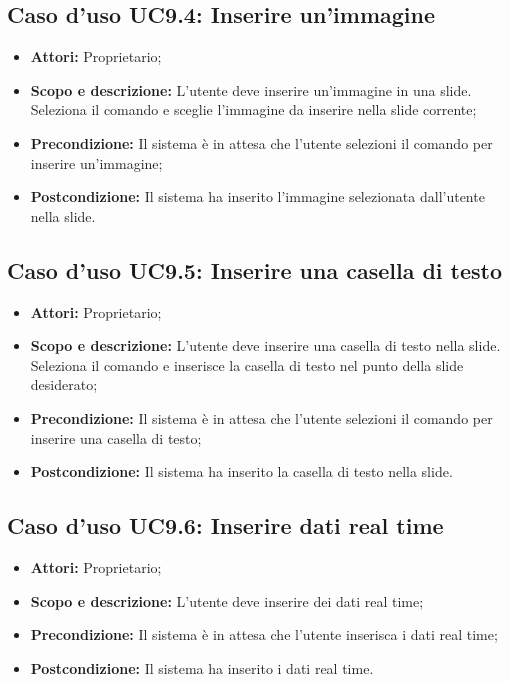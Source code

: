 \subsection{Caso d'uso UC9.4: Inserire un'immagine}
\begin{itemize}
\item \textbf{Attori:} Proprietario;
\item \textbf{Scopo e descrizione:} L'utente deve inserire un'immagine in una slide. Seleziona il comando e sceglie l'immagine da inserire nella slide corrente;
\item \textbf{Precondizione:} Il sistema è in attesa che l'utente selezioni il comando per inserire un'immagine;
\item \textbf{Postcondizione:} Il sistema ha inserito l'immagine selezionata dall'utente nella slide.
\end{itemize}


\subsection{Caso d'uso UC9.5: Inserire una casella di testo}
\begin{itemize}
\item \textbf{Attori:} Proprietario;
\item \textbf{Scopo e descrizione:} L'utente deve inserire una casella di testo nella slide. Seleziona il comando e inserisce la casella di testo nel punto della slide desiderato;
\item \textbf{Precondizione:} Il sistema è in attesa che l'utente selezioni il comando per inserire una casella di testo;
\item \textbf{Postcondizione:} Il sistema ha inserito la casella di testo nella slide.
\end{itemize}


\subsection{Caso d'uso UC9.6: Inserire dati real time}
\begin{itemize}
	\item \textbf{Attori:} Proprietario;
	\item \textbf{Scopo e descrizione:} L'utente deve inserire dei dati real time;
	\item \textbf{Precondizione:} Il sistema è in attesa che l'utente inserisca i dati real time;
	\item \textbf{Postcondizione:} Il sistema ha inserito i dati real time.
\end{itemize}


